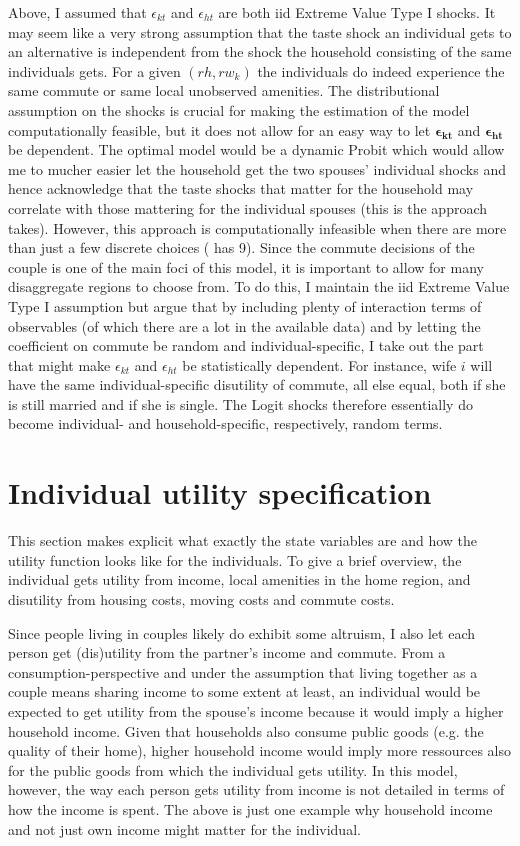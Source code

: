 Above, I assumed that $\epsilon_{kt}$ and $\epsilon_{ht}$ are both iid Extreme Value Type I shocks. It may seem like a very strong assumption that the taste shock an individual gets to an alternative is independent from the shock the household consisting of the same individuals gets. For a given $(rh,rw_k)$ the individuals do indeed experience the same commute or same local unobserved amenities. The distributional assumption on the shocks is crucial for making the estimation of the model computationally feasible, but it does not allow for an easy way to let $\boldsymbol{\epsilon_{kt}}$ and $\boldsymbol{\epsilon_{ht}}$ be dependent. The optimal model would be a dynamic Probit which would allow me to mucher easier let the household get the two spouses' individual shocks and hence acknowledge that the taste shocks that matter for the household may correlate with those mattering for the individual spouses (this is the approach \cite{Gemici2011} takes). However, this approach is computationally infeasible when there are more than just a few discrete choices (\cite{Gemici2011} has 9). Since the commute decisions of the couple is one of the main foci of this model, it is important to allow for many disaggregate regions to choose from. To do this, I maintain the iid Extreme Value Type I assumption but argue that by including plenty of interaction terms of observables (of which there are a lot in the available data) and by letting the coefficient on commute be random and individual-specific, I take out the part that might make $\epsilon_{kt}$ and $\epsilon_{ht}$ be statistically dependent. For instance, wife $i$ will have the same individual-specific disutility of commute, all else equal, both if she is still married and if she is single. The Logit shocks therefore essentially do become individual- and household-specific, respectively, random terms.  


\section{Individual utility specification}
This section makes explicit what exactly the state variables are and how the utility function looks like for the individuals. To give a brief overview, the individual gets utility from income, local amenities in the home region, and disutility from housing costs, moving costs and commute costs. 

Since people living in couples likely do exhibit some altruism, I also let each person get (dis)utility from the partner's income and commute. From a consumption-perspective and under the assumption that living together as a couple means sharing income to some extent at least, an individual would be expected to get utility from the spouse's income because it would imply a higher household income. Given that households also consume public goods (e.g. the quality of their home), higher household income would imply more ressources also for the public goods from which the individual gets utility. In this model, however, the way each person gets utility from income is not detailed in terms of how the income is spent. The above is just one example why household income and not just own income might matter for the individual. 

